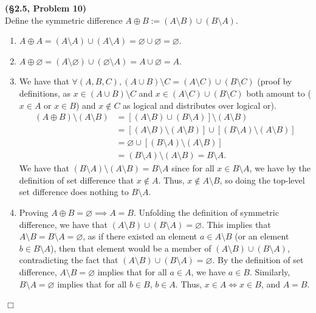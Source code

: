 \documentclass[12pt]{article}
\theoremstyle{definition}
\newenvironment{Solution}{\noindent {\sc Solution.}}{$\Box$ \vspace{2 ex}}
\begin{document}
\begin{Solution}
{\bf (\S2.5, Problem 10)}\\
Define the symmetric difference $A \oplus B:= (A\setminus B)\cup (B\setminus A)$.
\begin{enumerate}[label=\alph*.]
\item $A \oplus A=(A \setminus A)\cup (A\setminus A) = \varnothing \cup \varnothing =\varnothing$.
\item $A \oplus \varnothing = (A\setminus \varnothing)\cup (\varnothing \setminus A)=A\cup \varnothing = A$.
\item We have that $\forall (A,B,C), (A\cup B) \setminus C=(A\setminus C) \cup (B \setminus C)$ (proof by definitions, as $x \in (A\cup B)\setminus C$ and $x \in (A \setminus C) \cup (B\setminus C)$ both amount to ($x \in A$ or $x \in B$) and $x \not \in C$ as logical and distributes over logical or). \begin{align*}
    (A \oplus B)\setminus (A\setminus B) &= [(A \setminus B)\cup (B\setminus A)]\setminus (A\setminus B) \\
    &= [(A\setminus B)\setminus(A\setminus B)]\cup [(B\setminus A)\setminus(A\setminus B)] \\
    &= \varnothing \cup [(B\setminus A)\setminus (A\setminus B)] \\ &= (B\setminus A)\setminus (A\setminus B)
    =  \boxed{B\setminus A}.
\end{align*}
We have that $(B \setminus A) \setminus (A \setminus B) = B\setminus A$ since for all $x \in B \setminus A$, we have by the definition of set difference that $x \not \in A$. Thus, $x \not \in A\setminus B$, so doing the top-level set difference does nothing to $B \setminus A$.
\item Proving $A\oplus B=\varnothing \implies A = B$. Unfolding the definition of symmetric difference, we have that $(A \setminus B)\cup (B \setminus A) = \varnothing$. This implies that $A \setminus B =B\setminus A=\varnothing$, as if there existed an element $a \in A \setminus B$ (or an element $b \in B \setminus A$), then that element would be a member of $(A \setminus B)\cup (B\setminus A)$, contradicting the fact that $(A \setminus B)\cup (B \setminus A) = \varnothing$. By the definition of set difference, $A \setminus B = \varnothing$ implies that for all $a \in A$, we have $a \in B$. Similarly, $B \setminus A =\varnothing$ implies that for all $b \in B$, $b \in A$. Thus, $x \in A \iff x \in B$, and $A = B$.

\end{enumerate}
\end{Solution}
\end{document}
